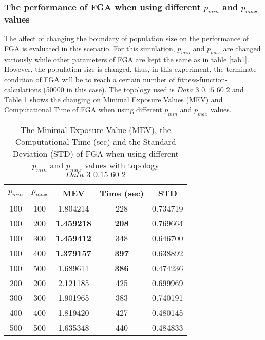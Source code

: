 \documentclass[final]{elsarticle}
\begin{document}
\subsubsection{The performance of FGA when using different $ p_{min} $ and $ p_{max} $ values}
The affect of changing the boundary of population size on the performance of FGA is evaluated in this scenario. For this simulation, $ p_{min} $ and $ p_{max} $ are changed variously while other parameters of FGA are kept the same as in table \ref{tab1}. However, the population size is changed, thus, in this experiment, the terminate condition of FGA will be to reach a certain number of fitness-function-calculations (50000 in this case). The topology used is $ Data\_3\_0.15\_60\_2 $ and Table \ref{tab2} shows the changing on Minimal Exposure Values (MEV) and Computational Time of FGA when using different $ p_{min} $ and $ p_{max} $ values.
\begin{table}
	\caption{The Minimal Exposure Value (MEV), the Computational Time (sec) and the Standard Deviation (STD) of FGA when using different $ p_{min} $ and $ p_{max} $ values with topology $ Data\_3\_0.15\_60\_2 $  }
	\label{tab2}       %
	\begin{center}
		\renewcommand{\arraystretch}{1.5}
		\begin{tabular}{|c|c|c|c|c|}
			\hline
			$ p_{min} $ & $ p_{max} $  & \textbf{MEV} & \textbf{Time (sec)} & \textbf{STD} \\
			\hline
			100 & 100 &1.804214 &228 &0.734719\\
			\hline
			100 & 200 &\textbf{1.459218} &\textbf{208} &0.769664\\
			\hline
			100 & 300 &\textbf{1.459412} &348 &0.646700\\
			\hline
			100 & 400 &\textbf{1.379157} &\textbf{397} &0.638892\\
			\hline
			100 & 500 &1.689611 &\textbf{386} &0.474236\\
			\hline\hline
			200 & 200 &2.121185 &425 &0.699969\\\hline
			300 & 300 &1.901965 &383 &0.740191\\\hline
			400 & 400 &1.819420 &427 &0.480145\\\hline
			500 & 500 &1.635348 &440 &0.484833\\\hline
		\end{tabular}
	\end{center}
\end{table}
\end{document}
